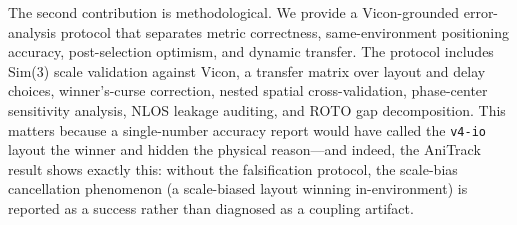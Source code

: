 \documentclass[11pt,a4paper]{article}
\begin{document}
The second contribution is methodological. We provide a Vicon-grounded
error-analysis protocol that separates metric correctness, same-environment
positioning accuracy, post-selection optimism, and dynamic transfer. The protocol
includes Sim(3) scale validation against Vicon, a transfer matrix over layout and
delay choices, winner's-curse correction, nested spatial cross-validation,
phase-center sensitivity analysis, NLOS leakage auditing, and ROTO gap
decomposition. This matters because a single-number accuracy report would have
called the \texttt{v4-io} layout the winner and hidden the physical reason---and indeed, the AniTrack
result \citep{luder_2025_anitrack} shows exactly this: without the falsification
protocol, the scale-bias cancellation phenomenon (a scale-biased layout winning in-environment) is reported as a success rather than
diagnosed as a coupling artifact.
\end{document}

